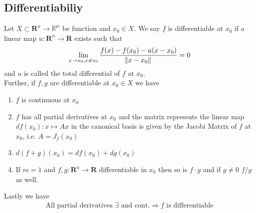 \documentclass[8pt]{extarticle}
\newcommand{\R}{{\mathbb R}}
\newcommand{\X}{{\mathcal X}}
\newcommand{\ra}{{\rightarrow}}
\def\R{\mathbf{R}}
\def\X{X}
\begin{document}
\begin{multicols*}{3}
  \subsection{Differentiabiliy}
  Let $\X \subset \R^n \ra \mathbb{R^m}$ be function
  and $x_0 \in \X$. We say $f$ is differentiable at $x_0$ if a linear map
  $u: \R^n \ra \R$ exists such that
  \begin{align*}
    \lim_{x \ra x_0, x \neq x_0} \frac{f(x) - f(x_0) - u(x - x_0)}{\norm*{x - x_0}} = 0
  \end{align*}
  and $u$ is called the total differential of $f$ at $x_0$.\\
  Further, if $f, g$ are differentiable at $x_0 \in \X$
  we have
  \begin{enumerate}[label=(\arabic*)]
    \item $f$ is continuous at $x_0$
    \item $f$ has all partial derivatives at $x_0$ and the
          matrix represents the linear map $df(x_0): x \mapsto Ax$
          in the canonical basis is given by the Jacobi Matrix of $f$
          at $x_0$, i.e. $A = J_f(x_0)$
    \item $d(f + g)(x_0) = df(x_0) + dg(x_0)$
    \item If $m = 1$ and $f, g: \R^n \ra \R$
          differentiable in $x_0$ then so is $f \cdot g$
          and if $g \neq 0$ $f / g$ as well.
  \end{enumerate}
  Lastly we have
  \begin{align*}
    \text{All partial derivatives $\exists$ and cont.}
    \Rightarrow f \text{ is differentiable} \\
  \end{align*}

\end{multicols*}
\end{document}
